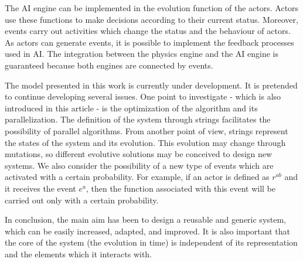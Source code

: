 \documentclass[10pt,journal,letterpaper,compsoc]{IEEEtran}
\begin{document}
The AI engine can be implemented in the evolution function of the actors. Actors use these
functions to make decisions according to their current status. Moreover, events carry out
activities which change the status and the behaviour of actors. As actors can generate events,
it is possible to implement the feedback processes used in AI. The integration between the physics
engine and the AI engine is guaranteed because both engines are connected by events.

The model presented in this work is currently under development. It is pretended to continue
developing several issues. One point to investigate - which is also introduced in this article - is
the optimization of the algorithm and its parallelization. The definition of the system through
strings facilitates the possibility of parallel algorithms. From another point of view, strings
represent the states of the system and its evolution. This evolution may change through mutations,
so different evolutive solutions may be conceived to design new systems. We also consider the
possibility of a new type of events which are activated with a certain probability. For example, if
an actor is defined as $r^{ab}$ and it receives the event $e^a$, then the function associated with
this event will be carried out only with a certain probability.

In conclusion, the main aim has been to design a reusable and generic system, which can be easily
increased, adapted, and improved. It is also important that the core of the system (the evolution
in time) is independent of its representation and the elements which it interacts with.








\end{document}
